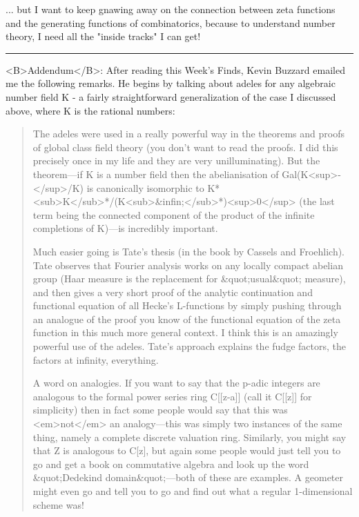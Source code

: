 ... but I want to keep gnawing away on the connection between zeta functions
and the generating functions of combinatorics, because to understand number 
theory, I need all the "inside tracks" I can get!
\par\noindent\rule{\textwidth}{0.4pt}
<B>Addendum</B>: 
After reading this Week's Finds, Kevin Buzzard emailed me the
following remarks.  He begins by talking about adeles for any
algebraic number field K - a fairly straightforward generalization of
the case I discussed above, where K is the rational numbers:

\begin{quote}
 The adeles were used in a really powerful way in the theorems and proofs
 of global class field theory (you don't want to read the proofs. I did
 this precisely once in my life and they are very unilluminating).  But the
 theorem---if K is a number field then the abelianisation of 
  Gal(K<sup>-</sup>/K)
  is canonically isomorphic to 
K*\Adeles<sub>K</sub>*/(K<sub>&infin;</sub>*)<sup>0</sup>
 (the last term being the connected component of the product of the
 infinite completions of K)---is incredibly important.

  Much easier going is Tate's thesis (in the book by Cassels and Froehlich).
 Tate observes that Fourier analysis works on any locally compact abelian 
 group (Haar measure is the replacement for &quot;usual&quot; measure), and then gives 
 a very short proof of the analytic continuation and functional equation of
 all Hecke's L-functions by simply pushing through an analogue of the proof
 you know of the functional equation of the zeta function in this much more
 general context.  I think this is an amazingly powerful use of the adeles.
 Tate's approach explains the fudge factors, the factors at infinity,
 everything.

 A word on analogies.  If you want to say that the p-adic integers are 
 analogous to the formal power series ring C[[z-a]] (call it C[[z]] 
 for simplicity) then in fact some people would say that this was <em>not</em> 
 an analogy---this was simply two instances of the same thing, namely a 
 complete discrete valuation ring. Similarly, you might say that Z is 
 analogous to C[z], but again some people would just tell you to go and 
 get a book on commutative algebra and look up the word &quot;Dedekind 
 domain&quot;---both of these are examples. A geometer might even go and 
 tell you to go and find out what a regular 1-dimensional scheme was!


\end{quote}

